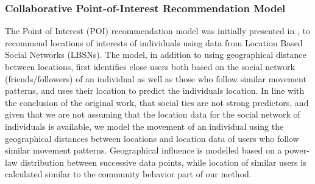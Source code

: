 \subsubsection{Collaborative Point-of-Interest Recommendation Model}
The Point of Interest (POI) recommendation model was initially presented in \cite{139}, to recommend locations of interests of individuals using data from Location Based Social Networks (LBSNs). 
The model, in addition to using geographical distance between locations, first identifies close users both based on the social network (friends/followers) of an individual as well as those who follow similar movement patterns, and uses their location to predict the individuals location. 
In line with the conclusion of the original work, that social ties are not strong predictors, and given that we are not assuming that the location data for the social network of individuals is available, we model the movement of an individual using the geographical distances between locations and location data of users who follow similar movement patterns.  
Geographical influence is modelled based on a power-law distribution between successive data points, while location of similar users is calculated similar to the community behavior part of our method. 

